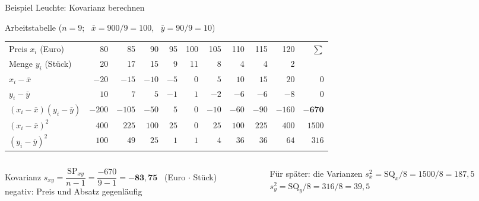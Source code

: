 \documentclass[aspectratio=169,11pt]{beamer}
\newcommand{\SQx}{\text{SQ}_x}
\newcommand{\SQy}{\text{SQ}_y}
\newcommand{\SPxy}{\text{SP}_{xy}}
\begin{document}
\begin{frame}{Beispiel Leuchte: Kovarianz berechnen}
  \begin{block}{Arbeitstabelle ($n = 9$; \ $\bar{x} = 900/9 = 100$, \ $\bar{y} = 90/9 = 10$)}
    \begin{center}
      \footnotesize
      \renewcommand{\arraystretch}{1.0}
      \begin{tabular}{l*{9}{r}r}
        \toprule
        Preis $x_i$ (Euro)           & 80     & 85     & 90    & 95   & 100 & 105   & 110   & 115   & 120    & $\sum$ \\
        Menge $y_i$ (Stück)          & 20     & 17     & 15    & 9    & 11  & 8     & 4     & 4     & 2      & \\
        \midrule
        $x_i - \bar{x}$              & $-20$  & $-15$  & $-10$ & $-5$ & $0$ & $5$   & $10$  & $15$  & $20$   & $0$ \\
        $y_i - \bar{y}$              & $10$   & $7$    & $5$   & $-1$ & $1$ & $-2$  & $-6$  & $-6$  & $-8$   & $0$ \\
        $(x_i-\bar{x})(y_i-\bar{y})$ & $-200$ & $-105$ & $-50$ & $5$  & $0$ & $-10$ & $-60$ & $-90$ & $-160$ & $\mathbf{-670}$ \\
        \midrule
        $(x_i-\bar{x})^{2}$          & $400$  & $225$  & $100$ & $25$ & $0$ & $25$  & $100$ & $225$ & $400$  & $1500$ \\
        $(y_i-\bar{y})^{2}$          & $100$  & $49$   & $25$  & $1$  & $1$ & $4$   & $36$  & $36$  & $64$   & $316$ \\
        \bottomrule
      \end{tabular}
    \end{center}
  \end{block}

  \begin{columns}[T]
    \begin{column}{0.54\textwidth}
      \begin{exampleblock}{Kovarianz}
        $s_{xy} = \dfrac{\SPxy}{n - 1} = \dfrac{-670}{9 - 1} = \mathbf{-83{,}75}$ \ (Euro $\cdot$ Stück)\\[2pt]
        negativ: Preis und Absatz gegenläufig
      \end{exampleblock}
    \end{column}
    \begin{column}{0.44\textwidth}
      \begin{block}{Für später: die Varianzen}
        $s_x^{2} = \SQx/8 = 1500/8 = 187{,}5$\\[2pt]
        $s_y^{2} = \SQy/8 = 316/8 = 39{,}5$
      \end{block}
    \end{column}
  \end{columns}

\end{frame}
\end{document}
